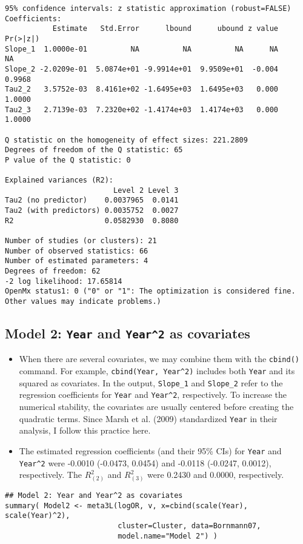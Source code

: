 \documentclass[11pt]{article}
\begin{document}
\begin{enumerate}
\begin{verbatim}
95% confidence intervals: z statistic approximation (robust=FALSE)
Coefficients:
           Estimate   Std.Error      lbound      ubound z value Pr(>|z|)
Slope_1  1.0000e-01          NA          NA          NA      NA       NA
Slope_2 -2.0209e-01  5.0874e+01 -9.9914e+01  9.9509e+01  -0.004   0.9968
Tau2_2   3.5752e-03  8.4161e+02 -1.6495e+03  1.6495e+03   0.000   1.0000
Tau2_3   2.7139e-03  7.2320e+02 -1.4174e+03  1.4174e+03   0.000   1.0000

Q statistic on the homogeneity of effect sizes: 221.2809
Degrees of freedom of the Q statistic: 65
P value of the Q statistic: 0

Explained variances (R2):
                         Level 2 Level 3
Tau2 (no predictor)    0.0037965  0.0141
Tau2 (with predictors) 0.0035752  0.0027
R2                     0.0582930  0.8080

Number of studies (or clusters): 21
Number of observed statistics: 66
Number of estimated parameters: 4
Degrees of freedom: 62
-2 log likelihood: 17.65814 
OpenMx status1: 0 ("0" or "1": The optimization is considered fine.
Other values may indicate problems.)
\end{verbatim}
\end{enumerate}

\subsection{Model 2: \texttt{Year} and \texttt{Year\textasciicircum{}2} as covariates}
\label{sec:org0a4954f}
\begin{itemize}
\item When there are several covariates, we may combine them with the \texttt{cbind()} command. For example, \texttt{cbind(Year, Year\textasciicircum{}2)} includes both \texttt{Year} and its squared as covariates. In the output, \texttt{Slope\_1} and \texttt{Slope\_2} refer to the regression coefficients for \texttt{Year} and \texttt{Year\textasciicircum{}2}, respectively. To increase the numerical stability, the covariates are usually centered before creating the quadratic terms. Since Marsh et al. (2009) standardized \texttt{Year} in their analysis, I follow this practice here.
\item The estimated regression coefficients (and their 95\% CIs) for \texttt{Year} and \texttt{Year\textasciicircum{}2} were -0.0010 (-0.0473, 0.0454) and -0.0118 (-0.0247, 0.0012), respectively. The \(R^2_{(2)}\) and \(R^2_{(3)}\) were 0.2430 and 0.0000, respectively.
\end{itemize}
\begin{verbatim}
## Model 2: Year and Year^2 as covariates
summary( Model2 <- meta3L(logOR, v, x=cbind(scale(Year), scale(Year)^2), 
                          cluster=Cluster, data=Bornmann07,
                          model.name="Model 2") ) 
\end{verbatim}
\end{document}

